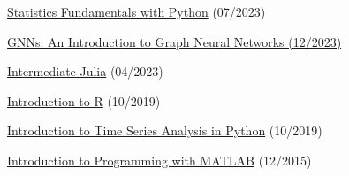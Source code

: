 \begin{cventries}
{\begin{cvitems}
            \item{\href{https://www.datacamp.com/completed/statement-of-accomplishment/track/f6b840f135825806cde25b622730d804b8e9b987}{Statistics Fundamentals with Python} (07/2023)}
            \item{\href{https://skillsoft.digitalbadges.skillsoft.com/30851258-8ee5-4f58-86ba-9a0e152c8434#gs.1s8e65}{GNNs: An Introduction to Graph Neural Networks (12/2023)}}
            \item{\href{https://www.datacamp.com/statement-of-accomplishment/course/930a810eaf9c88d856429bfabf33cb9df57e2046}{Intermediate Julia} (04/2023)}
            \item{\href{https://www.datacamp.com/statement-of-accomplishment/course/dd5746b9564cf374bcc0bb379e1801925e25259e}{Introduction to R} (10/2019)}
            \item{\href{https://www.datacamp.com/statement-of-accomplishment/course/807548ea866063da3c0083afcebf3be48d44f277}{Introduction to Time Series Analysis in Python} (10/2019)}
            \item {\href{https://www.coursera.org/account/accomplishments/verify/9G7V69L6QP}{Introduction to Programming with MATLAB} (12/2015)}
        \end{cvitems}      
    }

\end{cventries}
